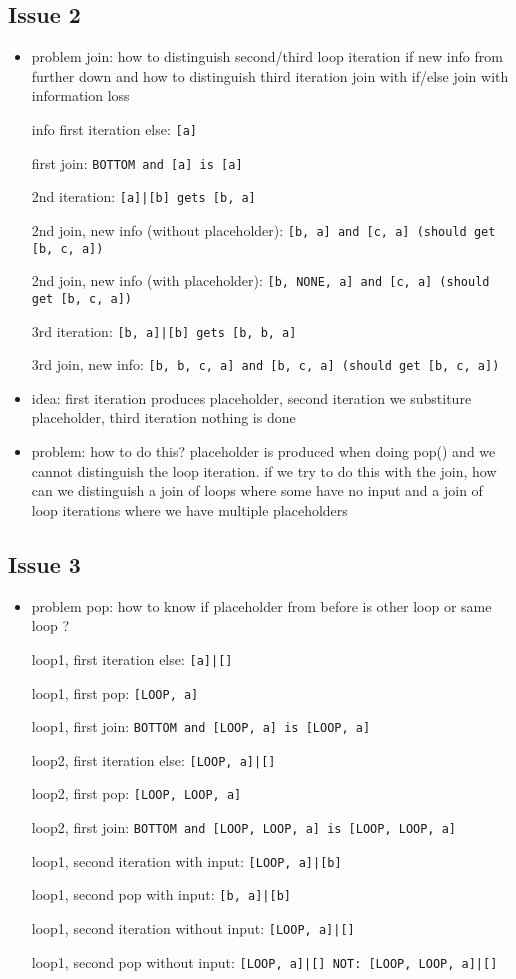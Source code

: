 \documentclass[11pt]{article}
\begin{document}
\subsection{Issue 2}

\begin{itemize}
\item problem join: how to distinguish second/third loop iteration if new info from further down and how to distinguish third iteration join with if/else join with information loss

info first iteration else: \verb/[a]/

first join: \verb/BOTTOM and [a] is [a]/

2nd iteration: \verb/[a]|[b] gets [b, a]/

2nd join, new info (without placeholder): \verb/[b, a] and [c, a] (should get [b, c, a])/

2nd join, new info (with placeholder): \verb/[b, NONE, a] and [c, a] (should get [b, c, a])/

3rd iteration: \verb/[b, a]|[b] gets [b, b, a]/

3rd join, new info: \verb/[b, b, c, a] and [b, c, a] (should get [b, c, a])/

\item idea: first iteration produces placeholder, second iteration we substiture placeholder, third iteration nothing is done
\item problem: how to do this? placeholder is produced when doing pop() and we cannot distinguish the loop iteration. if we try to do this with the join, how can we distinguish a join of loops where some have no input and a join of loop iterations where we have multiple placeholders
\end{itemize}

\subsection{Issue 3}

\begin{itemize}
\item problem pop: how to know if placeholder from before is other loop or same loop ?

loop1, first iteration else: \verb/[a]|[]/

loop1, first pop: \verb/[LOOP, a]/

loop1, first join: \verb/BOTTOM and [LOOP, a] is [LOOP, a]/

loop2, first iteration else: \verb/[LOOP, a]|[]/

loop2, first pop: \verb/[LOOP, LOOP, a]/

loop2, first join: \verb/BOTTOM and [LOOP, LOOP, a] is [LOOP, LOOP, a]/

loop1, second iteration with input: \verb/[LOOP, a]|[b]/

loop1, second pop with input: \verb/[b, a]|[b]/

loop1, second iteration without input: \verb/[LOOP, a]|[]/

loop1, second pop without input: \verb/[LOOP, a]|[] NOT: [LOOP, LOOP, a]|[]/

\end{itemize}
\end{document}
